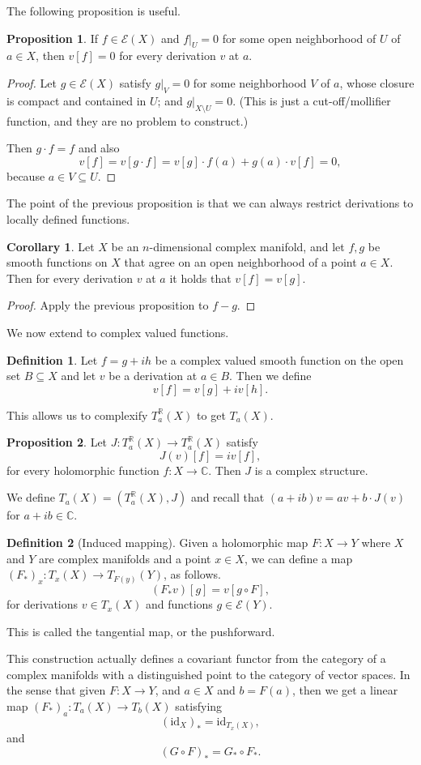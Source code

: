 \documentclass{article}
\theoremstyle{definition}
\newtheorem{defi}{Definition}
\newtheorem{coro}{Corollary}
\newtheorem{prop}{Proposition}
\begin{document}
The following proposition is useful.
\begin{prop}
  If $f\in\mathcal{E}(X)$ and $f|_U=0$ for some open neighborhood of $U$ of $a\in X$, then $v[f]=0$ for every derivation $v$ at $a$.
\end{prop}
\begin{proof}
  Let $g\in\mathcal{E}(X)$ satisfy $g|_V=0$ for some neighborhood $V$ of $a$, whose closure is compact and contained in $U$; and $g|_{X\setminus U}=0$. (This is just a cut-off/mollifier function, and they are no problem to construct.)

  Then $g\cdot f=f$ and also
  \[v[f]=v[g\cdot f]=v[g]\cdot f(a)+g(a)\cdot v[f]=0,\]
  because $a\in V\subseteq U$.
\end{proof}
The point of the previous proposition is that we can always restrict derivations to locally defined functions.
\begin{coro}
  Let $X$ be an $n$-dimensional complex manifold, and let $f,g$ be smooth functions on $X$ that agree on an open neighborhood of a point $a\in X$. Then for every derivation $v$ at $a$ it holds that $v[f]=v[g]$.
\end{coro}
\begin{proof}
  Apply the previous proposition to $f-g$.
\end{proof}
We now extend to complex valued functions.
\begin{defi}
  Let $f=g+ih$ be a complex valued smooth function on the open set $B\subseteq X$ and let $v$ be a derivation at $a\in B$. Then we define
  \[v[f]=v[g]+iv[h].\]
\end{defi}
This allows us to complexify $T^\mathbb{R}_a(X)$ to get $T_a(X)$.
\begin{prop}
  Let $J:T_a^\mathbb{R}(X)\to T_a^\mathbb{R}(X)$ satisfy
  \[J(v)[f]=iv[f],\]
  for every holomorphic function $f:X\to\mathbb{C}$. Then $J$ is a complex structure.
\end{prop}
We define $T_a(X)=(T^\mathbb{R}_a(X),J)$ and recall that $(a+ib)v=av+b\cdot J(v)$ for $a+ib\in\mathbb{C}$.

\begin{defi}[Induced mapping]
  Given a holomorphic map $F:X\to Y$ where $X$ and $Y$ are complex manifolds and a point $x\in X$, we can define a map $(F_\ast)_x:T_x(X)\to T_{F(y)}(Y)$, as follows.
  \[(F_\ast v)[g]=v[g\circ F],\]
  for derivations $v\in T_x(X)$ and functions $g\in\mathcal{E}(Y)$.

  This is called the tangential map, or the pushforward.
\end{defi}
This construction actually defines a covariant functor from the category of a complex manifolds with a distinguished point to the category of vector spaces. In the sense that given $F:X\to Y$, and $a\in X$ and $b=F(a)$, then we get a linear map $(F_\ast)_a:T_a(X)\to T_b(X)$ satisfying
\[(\mathrm{id}_X)_\ast=\mathrm{id}_{T_x(X)},\]
and
\[(G\circ F)_\ast=G_\ast\circ F_\ast.\]
\end{document}
